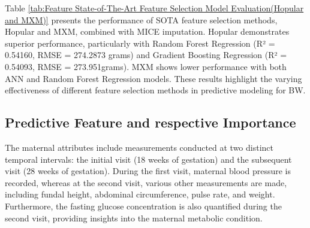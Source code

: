 \documentclass[12pt]{article}
\begin{document}


\begin{table}[htbp]
\centering
\caption{Feature State-of-The-Art Feature Selection Model Evaluation (Hopular and MXM)}
\label{tab:Feature State-of-The-Art Feature Selection Model Evaluation(Hopular and MXM)}
\end{table}


Table \ref{tab:Feature State-of-The-Art Feature Selection Model Evaluation(Hopular and MXM)} presents the performance of SOTA feature selection methods, Hopular and MXM, combined with MICE imputation. Hopular demonstrates superior performance, particularly with Random Forest Regression (R² = 0.54160, RMSE = 274.2873 grams) and Gradient Boosting Regression (R² = 0.54093, RMSE = 273.951grams). 
MXM shows lower performance with both ANN and Random Forest Regression models. These results highlight the varying effectiveness of different feature selection methods in predictive modeling for BW. 

\subsection{Predictive Feature and respective Importance}
The maternal attributes include measurements conducted at two distinct temporal intervals: the initial visit (18 weeks of gestation) and the subsequent visit (28 weeks of gestation). During the first visit, maternal blood pressure is recorded, whereas at the second visit, various other measurements are made, including fundal height, abdominal circumference, pulse rate, and weight.
Furthermore, the fasting glucose concentration is also quantified during the second visit, providing insights into the maternal metabolic condition.
\end{document}
